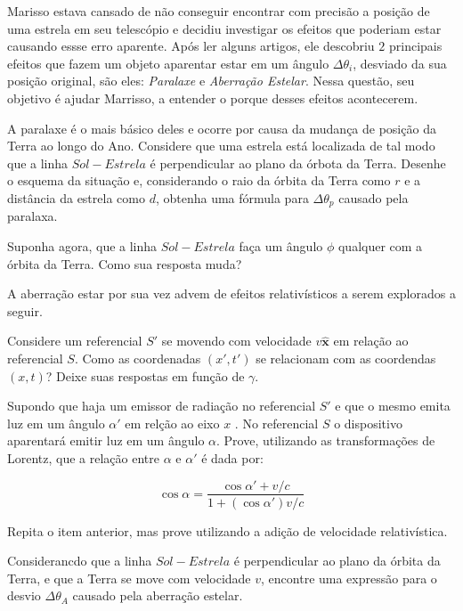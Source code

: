\documentclass[11pt]{article}
\begin{document}
\begin{pproblem} Marisso estava cansado de não conseguir encontrar com precisão a posição de uma estrela em seu telescópio e decidiu investigar os efeitos que poderiam estar causando essse erro aparente. Após ler alguns artigos, ele descobriu \(2\) principais efeitos que fazem um objeto aparentar estar em um ângulo \(\Delta \theta_i\), desviado da sua posição original, são eles: \textit{Paralaxe} e \textit{Aberração Estelar}. Nessa questão, seu objetivo é ajudar Marrisso, a entender o porque desses efeitos acontecerem.
    \begin{alternativas}
        \item A paralaxe é o mais básico deles e ocorre por causa da mudança de posição da Terra ao longo do Ano. Considere que uma estrela está localizada de tal modo que a linha \(Sol-Estrela\) é perpendicular ao plano da órbota da Terra. Desenhe o esquema da situação e, considerando o raio da órbita da Terra como \(r\) e a distância da estrela como \(d\), obtenha uma fórmula para \(\Delta \theta_p\) causado pela paralaxa.
        
        \item Suponha agora, que a linha \(Sol-Estrela\) faça um ângulo \(\phi\) qualquer com a órbita da Terra. Como sua resposta muda?
        
        A aberração estar por sua vez advem de efeitos relativísticos a serem explorados a seguir.

        \item Considere um referencial \(S'\) se movendo com velocidade \(v\hat{\mathbf{x}}\) em relação ao referencial \(S\). Como as coordenadas \((x', t')\) se relacionam com as coordendas \((x,t)\)? Deixe suas respostas em função de \(\gamma\).
        
        \item Supondo que haja um emissor de radiação no referencial \(S'\) e que o mesmo emita luz em um ângulo \(\alpha'\) em relção ao eixo \(x\) . No referencial \(S\) o dispositivo aparentará emitir luz em um ângulo \(\alpha\). Prove, utilizando as transformações de Lorentz, que a relação entre \(\alpha\) e \(\alpha'\) é dada por:
        
        \[\cos\alpha = \frac{\cos\alpha' + v/c}{1+(\cos\alpha') v/c}\]

        \item Repita o item anterior, mas prove utilizando a adição de velocidade relativística.

        \item Considerancdo que a linha \(Sol-Estrela\) é perpendicular ao plano da órbita da Terra, e que a Terra se move com velocidade \(v\), encontre uma expressão para o desvio \(\Delta\theta_A\) causado pela aberração estelar.
    

\end{alternativas}
\end{pproblem}
\end{document}
